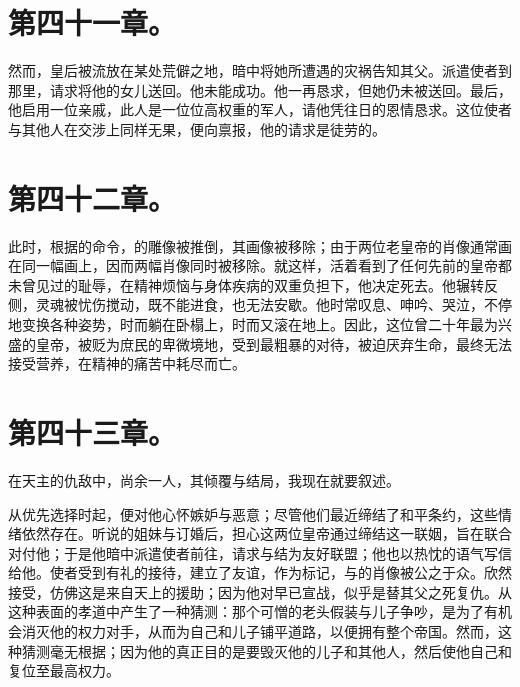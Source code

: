 
\section{第四十一章。}

然而，皇后被流放在某处荒僻之地，暗中将她所遭遇的灾祸告知其父。派遣使者到那里，请求将他的女儿送回。他未能成功。他一再恳求，但她仍未被送回。最后，他启用一位亲戚，此人是一位位高权重的军人，请他凭往日的恩情恳求。这位使者与其他人在交涉上同样无果，便向禀报，他的请求是徒劳的。\par


\section{第四十二章。}

此时，根据的命令，的雕像被推倒，其画像被移除；由于两位老皇帝的肖像通常画在同一幅画上，因而两幅肖像同时被移除。就这样，活着看到了任何先前的皇帝都未曾见过的耻辱，在精神烦恼与身体疾病的双重负担下，他决定死去。他辗转反侧，灵魂被忧伤搅动，既不能进食，也无法安歇。他时常叹息、呻吟、哭泣，不停地变换各种姿势，时而躺在卧榻上，时而又滚在地上。因此，这位曾二十年最为兴盛的皇帝，被贬为庶民的卑微境地，受到最粗暴的对待，被迫厌弃生命，最终无法接受营养，在精神的痛苦中耗尽而亡。\par


\section{第四十三章。}

在天主的仇敌中，尚余一人，其倾覆与结局，我现在就要叙述。\par

从优先选择时起，便对他心怀嫉妒与恶意；尽管他们最近缔结了和平条约，这些情绪依然存在。听说的姐妹与订婚后，担心这两位皇帝通过缔结这一联姻，旨在联合对付他；于是他暗中派遣使者前往，请求与结为友好联盟；他也以热忱的语气写信给他。使者受到有礼的接待，建立了友谊，作为标记，与的肖像被公之于众。欣然接受，仿佛这是来自天上的援助；因为他对早已宣战，似乎是替其父之死复仇。从这种表面的孝道中产生了一种猜测：那个可憎的老头假装与儿子争吵，是为了有机会消灭他的权力对手，从而为自己和儿子铺平道路，以便拥有整个帝国。然而，这种猜测毫无根据；因为他的真正目的是要毁灭他的儿子和其他人，然后使他自己和复位至最高权力。\par

